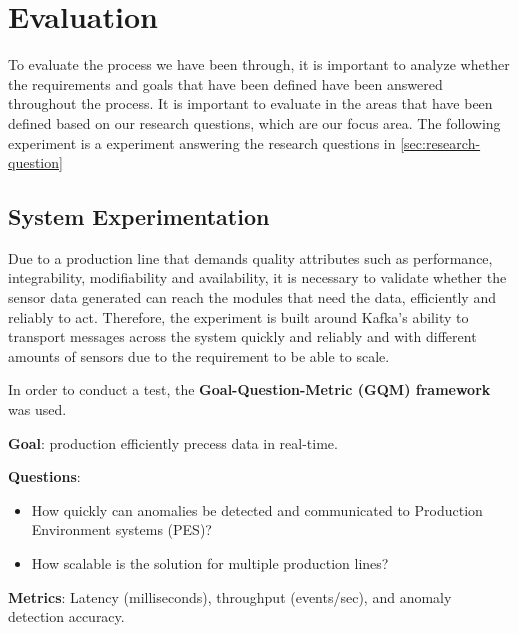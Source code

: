 \section{Evaluation}
\label{sec:evaluation}
To evaluate the process we have been through, it is important to analyze whether the requirements and goals that have been defined have been answered throughout the process. It is important to evaluate in the areas that have been defined based on our research questions, which are our focus area.
The following experiment is a experiment answering the research questions in \ref{sec:research-question}


\subsection{System Experimentation}
Due to a production line that demands quality attributes such as performance, integrability, modifiability and availability, it is necessary to validate whether the sensor data generated can reach the modules that need the data, efficiently and reliably to act. Therefore, the experiment is built around Kafka's ability to transport messages across the system quickly and reliably and with different amounts of sensors due to the requirement to be able to scale.

In order to conduct a test, the \textbf{Goal-Question-Metric (GQM) framework} was used.

\textbf{Goal}: production efficiently precess data in real-time.

\textbf{Questions}:
\begin{itemize}
    \item How quickly can anomalies be detected and communicated to Production Environment systems (PES)?
    \item How scalable is the solution for multiple production lines?
\end{itemize}
\textbf{Metrics}: Latency (milliseconds), throughput (events/sec), and anomaly detection accuracy.


